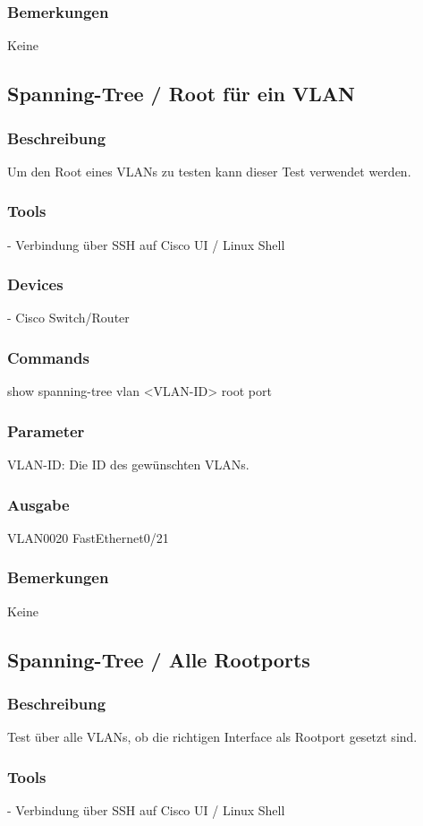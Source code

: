 \documentclass[a4,12pt]{scrartcl}
\begin{document}
\subsubsection{Bemerkungen}
Keine




\subsection{Spanning-Tree / Root für ein VLAN}
\subsubsection{Beschreibung}
Um den Root eines VLANs zu testen kann dieser Test verwendet werden.
\subsubsection{Tools}
- Verbindung über SSH auf Cisco UI / Linux Shell
\subsubsection{Devices}
- Cisco Switch/Router
\subsubsection{Commands}
show spanning-tree vlan <VLAN-ID> root port
\subsubsection{Parameter}
VLAN-ID: Die ID des gewünschten VLANs.
\subsubsection{Ausgabe}
VLAN0020         FastEthernet0/21
\subsubsection{Bemerkungen}
Keine


\subsection{Spanning-Tree / Alle Rootports}
\subsubsection{Beschreibung}
Test über alle VLANs, ob die richtigen Interface als Rootport gesetzt sind.
\subsubsection{Tools}
- Verbindung über SSH auf Cisco UI / Linux Shell
\end{document}
